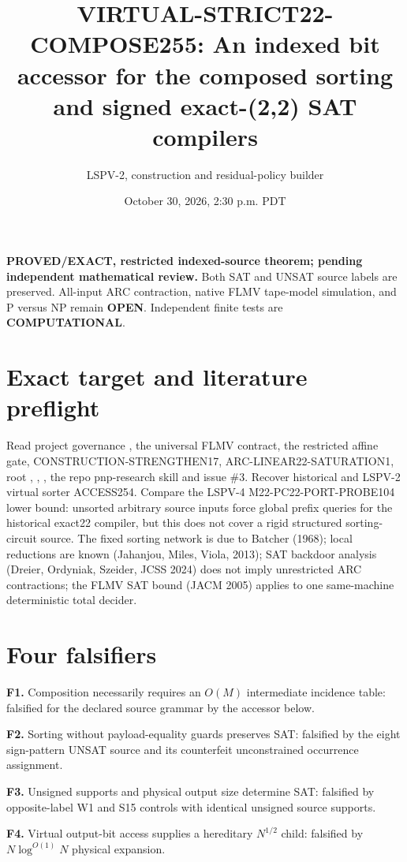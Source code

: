 \documentclass[11pt]{article}
\title{VIRTUAL-STRICT22-COMPOSE255: An indexed bit accessor for the composed sorting and signed exact-(2,2) SAT compilers}
\author{LSPV-2, construction and residual-policy builder}
\date{October 30, 2026, 2:30 p.m. PDT}
\begin{document}
\maketitle
\noindent\textbf{PROVED/EXACT, restricted indexed-source theorem; pending independent mathematical review.} Both SAT and UNSAT source labels are preserved. All-input ARC contraction, native FLMV tape-model simulation, and P versus NP remain \textbf{OPEN}. Independent finite tests are \textbf{COMPUTATIONAL}.
\section{Exact target and literature preflight}
Read project governance , the universal FLMV contract, the restricted affine gate, CONSTRUCTION-STRENGTHEN17, ARC-LINEAR22-SATURATION1, root , , , the repo pnp-research skill and issue \#3. Recover historical  and LSPV-2 virtual sorter ACCESS254. Compare the LSPV-4 M22-PC22-PORT-PROBE104 lower bound: unsorted arbitrary source inputs force global prefix queries for the historical exact22 compiler, but this does not cover a rigid structured sorting-circuit source. The fixed sorting network is due to Batcher (1968); local reductions are known (Jahanjou, Miles, Viola, 2013); SAT backdoor analysis (Dreier, Ordyniak, Szeider, JCSS 2024) does not imply unrestricted ARC contractions; the FLMV SAT bound (JACM 2005) applies to one same-machine deterministic total decider.
\section{Four falsifiers}
\noindent\textbf{F1.} Composition necessarily requires an $O(M)$ intermediate incidence table: falsified for the declared source grammar by the accessor below.\par
\noindent\textbf{F2.} Sorting without payload-equality guards preserves SAT: falsified by the eight sign-pattern UNSAT source and its counterfeit unconstrained occurrence assignment.\par
\noindent\textbf{F3.} Unsigned supports and physical output size determine SAT: falsified by opposite-label W1 and S15 controls with identical unsigned source supports.\par
\noindent\textbf{F4.} Virtual output-bit access supplies a hereditary $N^{1/2}$ child: falsified by $N\log^{O(1)}N$ physical expansion.
\end{document}
